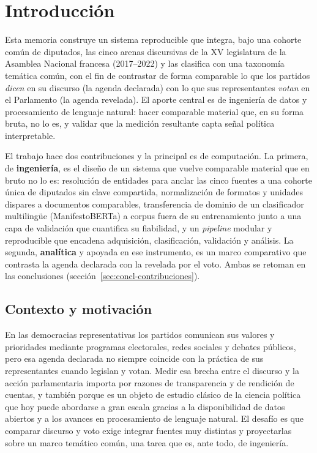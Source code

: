 \chapter{Introducción}
\label{cap:introduccion}


Esta memoria construye un sistema reproducible que integra, bajo una cohorte
común de diputados, las cinco arenas discursivas de la XV legislatura de la
Asamblea Nacional francesa (2017--2022) y las clasifica con una taxonomía
temática común, con el fin de contrastar de forma comparable lo que los partidos
\emph{dicen} en su discurso (la agenda declarada) con lo que sus representantes
\emph{votan} en el Parlamento (la agenda revelada). El aporte central es de
ingeniería de datos y procesamiento de lenguaje natural: hacer comparable
material que, en su forma bruta, no lo es, y validar que la medición resultante
capta señal política interpretable.

El trabajo hace dos contribuciones y la principal es de computación. La primera,
de \textbf{ingeniería}, es el diseño de un sistema que vuelve comparable material
que en bruto no lo es: resolución de entidades para anclar las cinco fuentes a una
cohorte única de diputados sin clave compartida, normalización de formatos y
unidades dispares a documentos comparables, transferencia de dominio de un
clasificador multilingüe (ManifestoBERTa) a corpus fuera de su entrenamiento junto
a una capa de validación que cuantifica su fiabilidad, y un \emph{pipeline} modular
y reproducible que encadena adquisición, clasificación, validación y análisis. La
segunda, \textbf{analítica} y apoyada en ese instrumento, es un marco comparativo
que contrasta la agenda declarada con la revelada por el voto. Ambas se retoman en
las conclusiones (sección~\ref{sec:concl-contribuciones}).

\section{Contexto y motivación}
\label{sec:contexto}

En las democracias representativas los partidos comunican sus valores y
prioridades mediante programas electorales, redes sociales y debates públicos,
pero esa agenda declarada no siempre coincide con la práctica de sus
representantes cuando legislan y votan. Medir esa brecha entre el discurso y la
acción parlamentaria importa por razones de transparencia y de rendición de
cuentas, y también porque es un objeto de estudio clásico de la ciencia política
que hoy puede abordarse a gran escala gracias a la disponibilidad de datos
abiertos y a los avances en procesamiento de lenguaje natural. El desafío es que
comparar discurso y voto exige integrar fuentes muy distintas y proyectarlas
sobre un marco temático común, una tarea que es, ante todo, de ingeniería.

